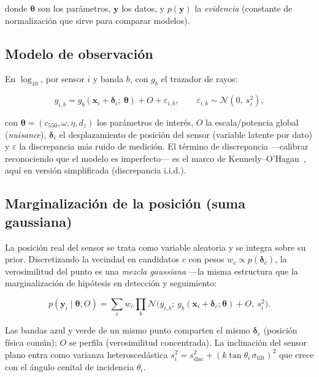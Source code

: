 donde $\boldsymbol\theta$ son los parámetros, $\mathbf{y}$ los datos, y
$p(\mathbf{y})$ la \emph{evidencia} (constante de normalización que sirve para
comparar modelos).

\subsection{Modelo de observación}

En $\log_{10}$, por sensor $i$ y banda $b$, con $g_b$ el trazador de rayos:

\begin{equation}
y_{i,b} = g_b(\mathbf{x}_i + \boldsymbol\delta_i;\ \boldsymbol\theta) + O + \varepsilon_{i,b},
\qquad \varepsilon_{i,b}\sim\mathcal{N}(0,\ s_i^2),
\label{eq:obsmodel}
\end{equation}

con $\boldsymbol\theta=(c_{550},\omega,\eta,d_z)$ los parámetros de interés, $O$ la
escala/potencia global (\emph{nuisance}), $\boldsymbol\delta_i$ el desplazamiento de
posición del sensor (variable latente por dato) y $\varepsilon$ la discrepancia más
ruido de medición. El término de discrepancia —calibrar reconociendo que el modelo
es imperfecto— es el marco de Kennedy--O'Hagan~\cite{kennedy2001}, aquí en versión
simplificada (discrepancia i.i.d.).

\subsection{Marginalización de la posición (suma gaussiana)}

La posición real del sensor se trata como variable aleatoria y se integra sobre su
prior. Discretizando la vecindad en candidatos $c$ con pesos $w_c\propto
p(\boldsymbol\delta_c)$, la verosimilitud del punto es una \emph{mezcla gaussiana}
—la misma estructura que la marginalización de hipótesis en detección y seguimiento:

\begin{equation}
p(\mathbf{y}_i\mid\boldsymbol\theta,O) = \sum_c w_c \prod_b
\mathcal{N}\!\bigl(y_{i,b};\ g_b(\mathbf{x}_i+\boldsymbol\delta_c;\boldsymbol\theta)+O,\ s_i^2\bigr).
\label{eq:mixlike}
\end{equation}

Las bandas azul y verde de un mismo punto comparten el mismo
$\boldsymbol\delta_c$ (posición física común); $O$ se perfila (verosimilitud
concentrada). La inclinación del sensor plano entra como varianza heteroscedástica
$s_i^2 = s_\text{disc}^2 + (k\tan\theta_i\,\sigma_\text{tilt})^2$ que crece con el
ángulo cenital de incidencia $\theta_i$.

